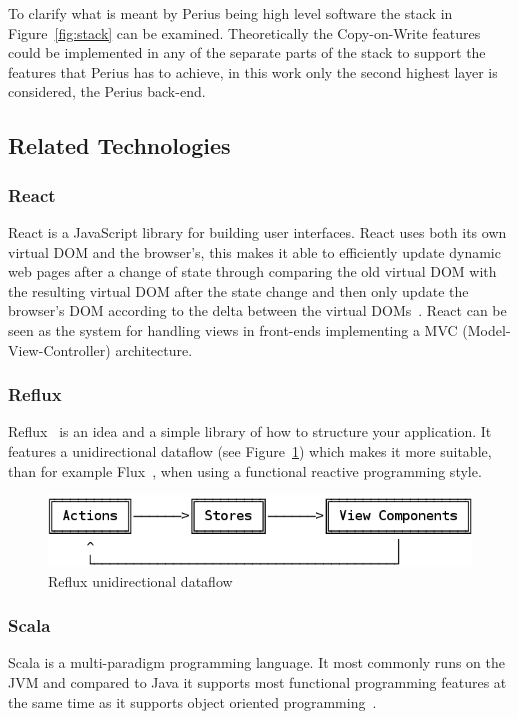 \documentclass[a4paper,12pt]{article}
\begin{document}
To clarify what is meant by Perius being high level software the stack in Figure~\ref{fig:stack} can
be examined. Theoretically the Copy-on-Write features could be implemented in any of the separate
parts of the stack to support the features that Perius has to achieve, in this work only the second
highest layer is considered, the Perius back-end.

\subsection{Related Technologies}
\subsubsection{React}
React is a JavaScript library for building user interfaces. React uses both its own virtual DOM and
the browser's, this makes it able to efficiently update dynamic web pages after a change of state
through comparing the old virtual DOM with the resulting virtual DOM after the state change and then
only update the browser's DOM according to the delta between the virtual DOMs~\cite{REACT}. React
can be seen as the system for handling views in front-ends implementing a MVC
(Model-View-Controller) architecture.

\subsubsection{Reflux}
Reflux~\cite{REFLUX} is an idea and a simple library of how to structure your application. It
features a unidirectional dataflow (see Figure~\ref{fig:reflux}) which makes it more suitable, than
for example Flux~\cite{FLUX}, when using a functional reactive programming style.

\begin{figure}[H] 
    \centering
    \includegraphics[scale=0.4]{reflux.png}
    \caption{Reflux unidirectional dataflow}
    \label{fig:reflux}
\end{figure}

\subsubsection{Scala} 
Scala is a multi-paradigm programming language. It most commonly runs on the JVM and compared to
Java it supports most functional programming features at the same time as it supports object
oriented programming~\cite{SCALA}.  
\end{document}
